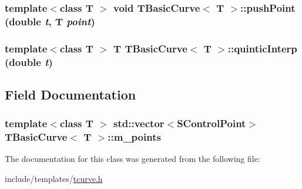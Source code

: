 \label{classTBasicCurve_ad584a903021913723ff11c6eff6c4b0d}
\hypertarget{classTBasicCurve_add191aa03c62b7d8b3a99ac84926cefc}{
\subsubsection[{pushPoint}]{\setlength{\rightskip}{0pt plus 5cm}template$<$class T $>$ void {\bf TBasicCurve}$<$ T $>$::pushPoint (double {\em t}, \/  T {\em point})}}
\label{classTBasicCurve_add191aa03c62b7d8b3a99ac84926cefc}
\hypertarget{classTBasicCurve_a1e76a2d45c4ff0bf074c28936efe359a}{
\subsubsection[{quinticInterp}]{\setlength{\rightskip}{0pt plus 5cm}template$<$class T $>$ T {\bf TBasicCurve}$<$ T $>$::quinticInterp (double {\em t})}}
\label{classTBasicCurve_a1e76a2d45c4ff0bf074c28936efe359a}


\subsection{Field Documentation}
\hypertarget{classTBasicCurve_adcac1bd879cba09e8e0c9b6b6ebc5760}{
\subsubsection[{m\_\-points}]{\setlength{\rightskip}{0pt plus 5cm}template$<$class T $>$ std::vector$<${\bf SControlPoint}$>$ {\bf TBasicCurve}$<$ T $>$::{\bf m\_\-points}}}
\label{classTBasicCurve_adcac1bd879cba09e8e0c9b6b6ebc5760}


The documentation for this class was generated from the following file:\begin{DoxyCompactItemize}
\item 
include/templates/\hyperlink{tcurve_8h}{tcurve.h}\end{DoxyCompactItemize}
